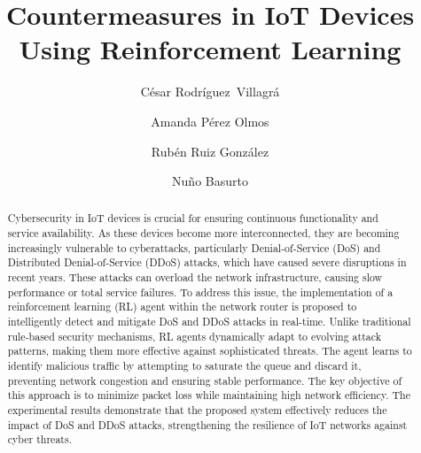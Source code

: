 \documentclass[runningheads]{llncs}
\begin{document}
%
\title{Countermeasures in IoT Devices Using Reinforcement Learning}
%
%
\author{C\'{e}sar {Rodr\'{i}guez~Villagr\'{a}} \and Amanda P\'{e}rez Olmos   \and Rub\'{e}n Ruiz Gonz\'{a}lez \and Nu{\~n}o Basurto}
%
%
%
\maketitle              %
%
\begin{abstract}
Cybersecurity in IoT devices is crucial for ensuring continuous functionality and service availability. As these devices become more interconnected, they are becoming increasingly vulnerable to cyberattacks, particularly Denial-of-Service (DoS) and Distributed Denial-of-Service (DDoS) attacks, which have caused severe disruptions in recent years. These attacks can overload the network infrastructure, causing slow performance or total service failures. 
To address this issue, the implementation of a reinforcement learning (RL) agent within the network router is proposed to intelligently detect and mitigate DoS and DDoS attacks in real-time. Unlike traditional rule-based security mechanisms, RL agents dynamically adapt to evolving attack patterns, making them more effective against sophisticated threats. The agent learns to identify malicious traffic by attempting to saturate the queue and discard it, preventing network congestion and ensuring stable performance.
The key objective of this approach is to minimize packet loss while maintaining high network efficiency. The experimental results demonstrate that the proposed system effectively reduces the impact of DoS and DDoS attacks, strengthening the resilience of IoT networks against cyber threats.

 

\end{abstract}
%
%
%
\end{document}
